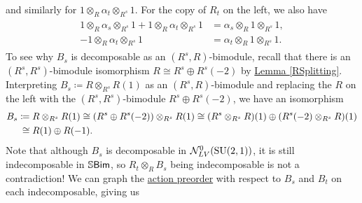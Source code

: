 \begin{example}
\noindent and similarly for $1 \otimes_R \alpha_t \otimes_{R^s} 1$. For the copy of $R_t$ on the left, we also have
\begin{align*}
\begin{split}
1 \otimes_R \alpha_s \otimes_{R^s} 1 + 1 \otimes_R \alpha_t \otimes_{R^s} 1 &= \alpha_s \otimes_R 1 \otimes_{R^s} 1,\\
-1 \otimes_R \alpha_t \otimes_{R^s} 1 &= \alpha_t  \otimes_R 1 \otimes_{R^s} 1.
\end{split}
\end{align*}
\noindent To see why $B_s$ is decomposable as an $(R^s, R)$-bimodule, recall that there is an $(R^s, R^s)$-bimodule isomorphism $R \cong R^s \oplus R^s(-2)$ by \hyperref[RSplitting]{Lemma \ref*{RSplitting}}. Interpreting $B_s \coloneqq R \otimes_{R^s} R(1)$ as an $(R^s, R)$-bimodule and replacing the $R$ on the left with the $(R^s, R^s)$-bimodule $R^s \oplus R^s(-2)$, we have an %
isomorphism
\begin{align*}
\begin{split}
B_s &\coloneqq R \otimes_{R^s} R(1) \cong (R^s \oplus R^s(-2)) \otimes_{R^s} R(1) \cong (R^s \otimes_{R^s} R)(1) \oplus (R^s(-2) \otimes_{R^s} R)(1)\\
&\hphantom{\coloneqq}\nhphantom{$\cong$}\cong R(1) \oplus R(-1).
\end{split}
\end{align*}
\noindent Note that although $B_s$ is decomposable in $\mathcal{N}_{LV}^0(\textup{SU}(2, 1))$, it is still indecomposable in $\mathbb{S}\textup{\textsf{Bim}}$, so $R_t \otimes_R B_s$ being indecomposable is not a contradiction! We can graph the \hyperref[ActionPreorder]{action preorder} with respect to $B_s$ and $B_t$ on each indecomposable, giving us\\[-4.1\linespacing]
\begin{center}
\end{center}
\end{example}
